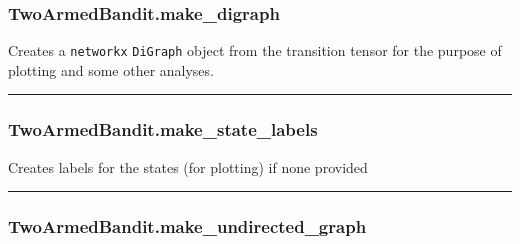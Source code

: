 \hypertarget{twoarmedbandit.make_digraph}{%
\subsubsection{TwoArmedBandit.make\_digraph}\label{twoarmedbandit.make_digraph}}

\begin{Shaded}
\begin{Highlighting}[]
\NormalTok{)}
\end{Highlighting}
\end{Shaded}

Creates a \texttt{networkx} \texttt{DiGraph} object from the transition
tensor for the purpose of plotting and some other analyses.

\begin{center}\rule{0.5\linewidth}{\linethickness}\end{center}

\hypertarget{twoarmedbandit.make_state_labels}{%
\subsubsection{TwoArmedBandit.make\_state\_labels}\label{twoarmedbandit.make_state_labels}}

\begin{Shaded}
\begin{Highlighting}[]
\NormalTok{)}
\end{Highlighting}
\end{Shaded}

Creates labels for the states (for plotting) if none provided

\begin{center}\rule{0.5\linewidth}{\linethickness}\end{center}

\hypertarget{twoarmedbandit.make_undirected_graph}{%
\subsubsection{TwoArmedBandit.make\_undirected\_graph}\label{twoarmedbandit.make_undirected_graph}}

\begin{Shaded}
\begin{Highlighting}[]
\NormalTok{)}
\end{Highlighting}
\end{Shaded}

